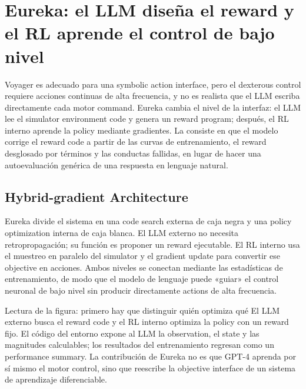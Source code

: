 \section{Eureka: el LLM diseña el reward y el RL aprende el control de bajo nivel}

Voyager es adecuado para una symbolic action interface, pero el dexterous control requiere acciones continuas de alta frecuencia, y no es realista que el LLM escriba directamente cada motor command. Eureka cambia el nivel de la interfaz: el LLM lee el simulator environment code y genera un reward program; después, el RL interno aprende la policy mediante gradientes. La  consiste en que el modelo corrige el reward code a partir de las curvas de entrenamiento, el reward desglosado por términos y las conductas fallidas, en lugar de hacer una autoevaluación genérica de una respuesta en lenguaje natural.

\subsection{Hybrid-gradient Architecture}

Eureka divide el sistema en una code search externa de caja negra y una policy optimization interna de caja blanca. El LLM externo no necesita retropropagación; su función es proponer un reward ejecutable. El RL interno usa el muestreo en paralelo del simulator y el gradient update para convertir ese objective en acciones. Ambos niveles se conectan mediante las estadísticas de entrenamiento, de modo que el modelo de lenguaje puede «guiar» el control neuronal de bajo nivel sin producir directamente actions de alta frecuencia.


\begin{knowledgebox}{Lectura de la figura: primero hay que distinguir quién optimiza qué}
El LLM externo busca el reward code y el RL interno optimiza la policy con un reward fijo. El código del entorno expone al LLM la observation, el state y las magnitudes calculables; los resultados del entrenamiento regresan como un performance summary. La contribución de Eureka no es que GPT-4 aprenda por sí mismo el motor control, sino que reescribe la objective interface de un sistema de aprendizaje diferenciable.
\end{knowledgebox}

